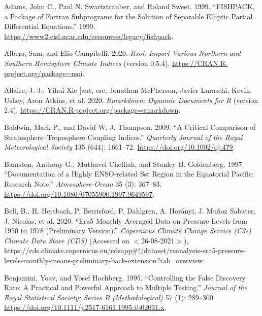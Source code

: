 \documentclass[smallextended]{svjour3}       %
\newlength{\cslhangindent}
\newlength{\cslentryspacingunit} %
\newenvironment{CSLReferences}[2] %
 {%
  \setlength{\parindent}{0pt}
  \ifodd #1
  \let\oldpar\par
  \def\par{\hangindent=\cslhangindent\oldpar}
  \fi
  \setlength{\parskip}{#2\cslentryspacingunit}
 }%
 {}
\begin{document}
\hypertarget{refs}{}
\begin{CSLReferences}{1}{0}
\leavevmode{}%
Adams, John C., Paul N. Swartztrauber, and Roland Sweet. 1999. {``{FISHPACK}, a Package of {Fortran} Subprograms for the Solution of Separable Elliptic Partial Differential Equations.''} 1999. \url{https://www2.cisl.ucar.edu/resources/legacy/fishpack}.

\leavevmode{}%
Albers, Sam, and Elio Campitelli. 2020. \emph{Rsoi: {Import Various Northern} and {Southern Hemisphere Climate Indices}} (version 0.5.4). \url{https://CRAN.R-project.org/package=rsoi}.

\leavevmode{}%
Allaire, J. J., Yihui Xie {[}aut, cre, Jonathan McPherson, Javier Luraschi, Kevin Ushey, Aron Atkins, et al. 2020. \emph{Rmarkdown: {Dynamic Documents} for {R}} (version 2.4). \url{https://CRAN.R-project.org/package=rmarkdown}.

\leavevmode{}%
Baldwin, Mark P., and David W. J. Thompson. 2009. {``A Critical Comparison of Stratosphere--Troposphere Coupling Indices.''} \emph{Quarterly Journal of the Royal Meteorological Society} 135 (644): 1661--72. \url{https://doi.org/10.1002/qj.479}.

\leavevmode{}%
Bamston, Anthony G., Muthuvel Chelliah, and Stanley B. Goldenberg. 1997. {``Documentation of a Highly {ENSO}‐related Sst Region in the Equatorial Pacific: {Research} Note.''} \emph{Atmosphere-Ocean} 35 (3): 367--83. \url{https://doi.org/10.1080/07055900.1997.9649597}.

\leavevmode{}%
Bell, B., H. Hersbach, P. Berrisford, P. Dahlgren, A. Horányi, J. Muñoz Sabater, J. Nicolas, et al. 2020. {``{Era5} Monthly Averaged Data on Pressure Levels from 1950 to 1978 (Preliminary Version).''} \emph{{Copernicus Climate Change Service} ({C3s}) {Climate Data Store} ({CDS})} (Accessed on {\(<\)}26-08-2021{\(>\)}), https://cds.climate.copernicus.eu/cdsapp\#!/dataset/reanalysis-era5-pressure-levels-monthly-means-preliminary-back-extension?tab=overview.

\leavevmode{}%
Benjamini, Yoav, and Yosef Hochberg. 1995. {``Controlling the {False Discovery Rate}: {A Practical} and {Powerful Approach} to {Multiple Testing}.''} \emph{Journal of the Royal Statistical Society: Series B (Methodological)} 57 (1): 289--300. \url{https://doi.org/10.1111/j.2517-6161.1995.tb02031.x}.


\end{CSLReferences}
\end{document}
